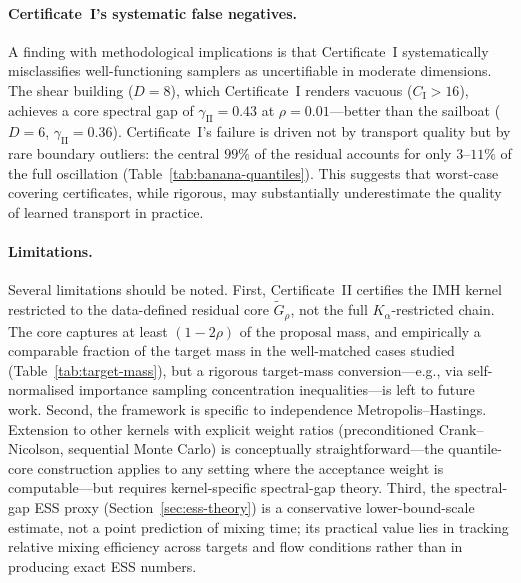 \documentclass[12pt]{article}
\begin{document}
\paragraph{Certificate~I's systematic false negatives.}
A finding with methodological implications is that Certificate~I systematically misclassifies well-functioning samplers as uncertifiable in moderate dimensions.
The shear building ($D = 8$), which Certificate~I renders vacuous ($C_{\mathrm{I}} > 16$), achieves a core spectral gap of $\gamma_{\mathrm{II}} = 0.43$ at $\rho = 0.01$---better than the sailboat ($D = 6$, $\gamma_{\mathrm{II}} = 0.36$).
Certificate~I's failure is driven not by transport quality but by rare boundary outliers: the central $99\%$ of the residual accounts for only $3$--$11\%$ of the full oscillation (Table~\ref{tab:banana-quantiles}).
This suggests that worst-case covering certificates, while rigorous, may substantially underestimate the quality of learned transport in practice.

\paragraph{Limitations.}
Several limitations should be noted.
First, Certificate~II certifies the IMH kernel restricted to the data-defined residual core $\tilde{G}_\rho$, not the full $K_\alpha$-restricted chain.
The core captures at least $(1-2\rho)$ of the proposal mass, and empirically a comparable fraction of the target mass in the well-matched cases studied (Table~\ref{tab:target-mass}), but a rigorous target-mass conversion---e.g., via self-normalised importance sampling concentration inequalities---is left to future work.
Second, the framework is specific to independence Metropolis--Hastings.
Extension to other kernels with explicit weight ratios (preconditioned Crank--Nicolson, sequential Monte Carlo) is conceptually straightforward---the quantile-core construction applies to any setting where the acceptance weight is computable---but requires kernel-specific spectral-gap theory.
Third, the spectral-gap ESS proxy (Section~\ref{sec:ess-theory}) is a conservative lower-bound-scale estimate, not a point prediction of mixing time; its practical value lies in tracking relative mixing efficiency across targets and flow conditions rather than in producing exact ESS numbers.
\end{document}
